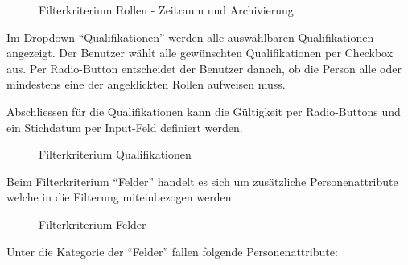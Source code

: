 \begin{figure}[h]
   \centering
   \caption{Filterkriterium Rollen - Zeitraum und Archivierung}
\end{figure}

\newpage

Im Dropdown ``Qualifikationen'' werden alle auswählbaren Qualifikationen angezeigt.
Der Benutzer wählt alle gewünschten Qualifikationen per Checkbox aus. Per Radio-Button entscheidet
der Benutzer danach, ob die Person alle oder mindestens eine der angeklickten Rollen aufweisen muss.

Abschliessen für die Qualifikationen kann die Gültigkeit per Radio-Buttons und ein Stichdatum
per Input-Feld definiert werden.

\begin{figure}[h]
   \centering
   \caption{Filterkriterium Qualifikationen}
\end{figure}

Beim Filterkriterium ``Felder'' handelt es sich um zusätzliche Personenattribute welche in
die Filterung miteinbezogen werden.

\begin{figure}[h]
   \centering
   \caption{Filterkriterium Felder}
\end{figure}

\newpage

Unter die Kategorie der ``Felder'' fallen folgende Personenattribute:

